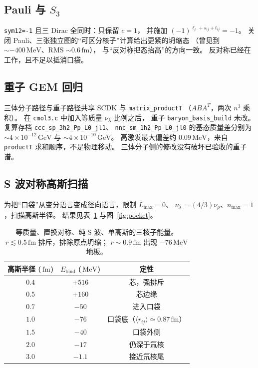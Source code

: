 \documentclass[12pt,a4paper]{article}
\newcommand{\GeV}{\,\mathrm{GeV}}
\newcommand{\MeV}{\,\mathrm{MeV}}
\newcommand{\fm}{\,\mathrm{fm}}
\begin{document}
\subsection{\texorpdfstring{Pauli 与 $S_3$}{Pauli 与 S3}}

\texttt{sym12=-1} 且三 Dirac 全同时：只保留 $c=1$，
并施加 $(-1)^{\ell_\rho+s_{ij}+t_{ij}}=-1$。
关闭 Pauli、三张独立图的``可区分核子''计算给出更紧的坍缩态
（曾见到 $\sim -400\MeV$、RMS $\sim 0.6\fm$），
与``反对称把态抬高''的方向一致。
反对称已经在工作，且不足以抵消口袋。

\subsection{重子 GEM 回归}

三体分子路径与重子路径共享 SCDK 与 \texttt{matrix\_productT}
（$ABA^T$，两次 $n^3$ 乘积）。
在 \texttt{cmol3.c} 中加入等质量 $\nu_\lambda$ 比例之后，
重子 \texttt{baryon\_basis\_build} 未改。
复算存档
\texttt{ccc\_sp\_3h2\_Pp\_L0\_jl1}、
\texttt{nnc\_sm\_1h2\_Pp\_L0\_jl0}
的基态质量差分别为 $\sim 4\times 10^{-12}\GeV$ 与 $\sim 4\times 10^{-10}\GeV$。
高激发最大偏差约 $0.09\MeV$，来自 \texttt{productT} 求和顺序，不是物理移动。
三体分子侧的修改没有破坏已验收的重子谱。

\subsection{S 波对称高斯扫描}

为把``口袋''从变分语言变成径向语言，限制 $L_{\max}=0$、
$\nu_\lambda=(4/3)\nu_\rho$、$n_{\max}=1$，扫描高斯半径。
结果见表~\ref{tab:swave} 与图~\ref{fig:pocket}。

\begin{table}[htbp]
\centering
\caption{等质量、置换对称、纯 S 波、单高斯的三核子能量。
$r\lesssim 0.5\fm$ 排斥，排除原点坍缩；
$r\sim 0.9\fm$ 出现 $-76\MeV$ 地板。}
\label{tab:swave}
\begin{tabular}{@{}ccc@{}}
\toprule
高斯半径 ($\fm$) & $E_{\mathrm{bind}}$ ($\MeV$) & 定性 \\
\midrule
$0.4$ & $+516$ & 芯，强排斥 \\
$0.5$ & $+160$ & 芯边缘 \\
$0.7$ & $-50$ & 进入口袋 \\
$1.0$ & $-76$ & 口袋底（$\langle r_{ij}\rangle\simeq 0.87\fm$） \\
$1.5$ & $-40$ & 口袋外侧 \\
$2.0$ & $-17$ & 仍深于氚核 \\
$3.0$ & $-1.1$ & 接近氘核尾 \\
\bottomrule
\end{tabular}
\end{table}
\end{document}
